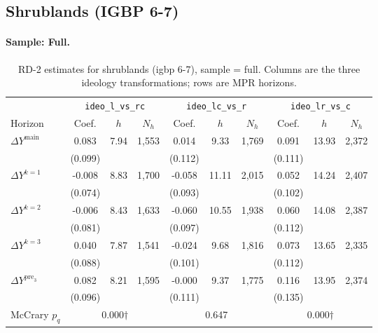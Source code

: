 \documentclass[11pt]{article}
\begin{document}
\clearpage
\subsection{Shrublands (IGBP 6-7)}
\paragraph{Sample: Full.}
\begin{table}[H]
\centering
\scriptsize
\caption{RD-2 estimates for shrublands (igbp 6-7), sample = full.
Columns are the three ideology transformations; rows are MPR horizons.}
\label{tab:rd2_shrublands_all}
\begin{tabular}{l ccc ccc ccc}
\toprule
 & \multicolumn{3}{c}{\texttt{ideo\_l\_vs\_rc}}
 & \multicolumn{3}{c}{\texttt{ideo\_lc\_vs\_r}}
 & \multicolumn{3}{c}{\texttt{ideo\_lr\_vs\_c}} \\
\cmidrule(lr){2-4} \cmidrule(lr){5-7} \cmidrule(lr){8-10}
Horizon & Coef. & $h$ & $N_h$ & Coef. & $h$ & $N_h$ & Coef. & $h$ & $N_h$ \\
\midrule
$\Delta Y^{\text{main}}$ & 0.083 & 7.94 & 1,553 & 0.014 & 9.33 & 1,769 & 0.091 & 13.93 & 2,372 \\
 & (0.099) &  &  & (0.112) &  &  & (0.111) &  &  \\
\addlinespace[1pt]
$\Delta Y^{k=1}$ & -0.008 & 8.83 & 1,700 & -0.058 & 11.11 & 2,015 & 0.052 & 14.24 & 2,407 \\
 & (0.074) &  &  & (0.093) &  &  & (0.102) &  &  \\
\addlinespace[1pt]
$\Delta Y^{k=2}$ & -0.006 & 8.43 & 1,633 & -0.060 & 10.55 & 1,938 & 0.060 & 14.08 & 2,387 \\
 & (0.081) &  &  & (0.097) &  &  & (0.112) &  &  \\
\addlinespace[1pt]
$\Delta Y^{k=3}$ & 0.040 & 7.87 & 1,541 & -0.024 & 9.68 & 1,816 & 0.073 & 13.65 & 2,335 \\
 & (0.088) &  &  & (0.101) &  &  & (0.112) &  &  \\
\addlinespace[1pt]
$\Delta Y^{\text{pre}_3}$ & 0.082 & 8.21 & 1,595 & -0.000 & 9.37 & 1,775 & 0.116 & 13.95 & 2,374 \\
 & (0.096) &  &  & (0.111) &  &  & (0.135) &  &  \\
\addlinespace[1pt]
\midrule
McCrary $p_q$ & \multicolumn{3}{c}{0.000$\dagger$} & \multicolumn{3}{c}{0.647} & \multicolumn{3}{c}{0.000$\dagger$} \\
\bottomrule
\end{tabular}
\end{table}
\end{document}
